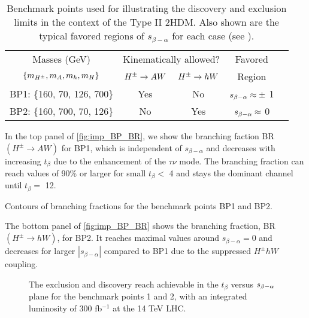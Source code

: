 \begin{table}
\begin{center}
 \begin{tabular}{ccccl}
 \toprule
 Masses (GeV) & \multicolumn{2}{c}{Kinematically allowed?} & Favored\\ \cmidrule{2-3}
 $\left\{ {m_{H^{\pm}},m_{A},m_{h},m_{H}}\right\}$ & $H^{\pm}\rightarrow A W$ & $H^{\pm}\rightarrow h W$ & Region\\\midrule
  BP1: \{160, 70, 126, 700\} & Yes & No & $s_{\beta-\alpha}\approx\pm$ 1 \\ \midrule
 BP2: \{160, 700, 70, 126\} & No & Yes & $s_{\beta-\alpha}\approx$ 0 \\
 \bottomrule
 \end{tabular}
\end{center}
\caption{Benchmark points used for illustrating the discovery and exclusion limits in the context of the Type II $2$HDM. Also shown are the typical favored regions of $s_{\beta-\alpha}$ for each case (see \cite{Coleppa:2013dya}). } 
\label{tab:classification}
\end{table}


In the top panel of \autoref{fig:imp_BP_BR}, we show the branching faction BR$(H^{\pm} \rightarrow AW)$ for BP1, which is independent of $s_{\beta-\alpha}$ and decreases with increasing $t_{\beta}$ due to the enhancement of the $\tau\nu$ mode. The branching fraction can reach values of 90\% or larger for small $t_{\beta}<$ 4 and stays the dominant channel until $t_{\beta}=$ 12. 

\begin{marginfigure}[3cm]
 \centering
\caption{Contours of branching fractions for the benchmark points BP1 and BP2.}
\label{fig:imp_BP_BR}
\end{marginfigure}

The bottom panel of \autoref{fig:imp_BP_BR} shows the branching fraction, BR$(H^{\pm} \rightarrow hW)$, for BP2. It reaches maximal values around $s_{\beta-\alpha}=0$ and decreases for larger $|s_{\beta-\alpha}|$ compared to BP1 due to the suppressed $H^{\pm} hW$ coupling. 

\begin{figure}
 \centering
\caption{The exclusion and discovery reach achievable in the $t_{\beta}$ versus $s_{\beta-\alpha}$ plane for the benchmark points 1 and 2, with an integrated luminosity of 300 fb$^{-1}$ at the 14 TeV LHC. }
\label{fig:imp_BP_Lim}
\end{figure}

